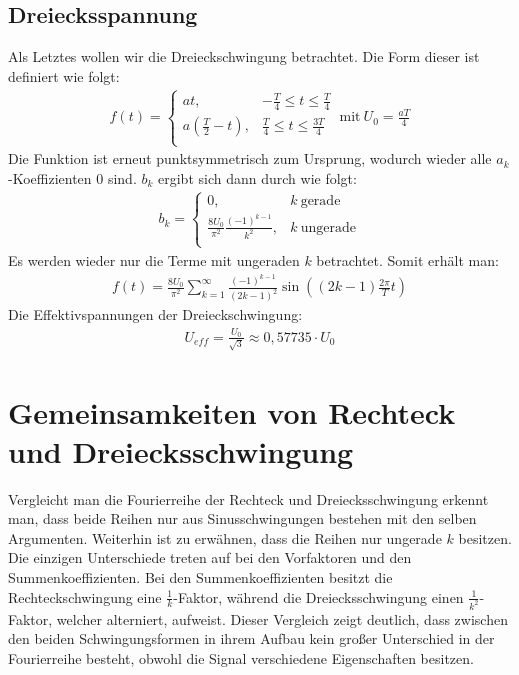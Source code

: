 \subsection*{Dreiecksspannung}
\label{sub:triangle}
Als Letztes wollen wir die Dreieckschwingung betrachtet. Die Form dieser ist definiert wie folgt:
\begin{gather}
    f(t) = 
    \begin{cases}
        at, & -\frac{T}{4} \leq t \leq \frac{T}{4} \\
        a\left(\frac{T}{2}-t\right), & \frac{T}{4} \leq t \leq \frac{3T}{4} \\
    \end{cases}
    ~\text{mit}~U_0 = \frac{aT}{4}
\end{gather} 
Die Funktion ist erneut punktsymmetrisch zum Ursprung, wodurch wieder alle $a_k$-Koeffizienten 0 sind. $b_k$ ergibt sich dann durch wie folgt:
\begin{gather}
    b_k =
    \begin{cases}
        0, & k~\text{gerade}\\
        \frac{8U_0}{\pi^2}\frac{(-1)^{k-1}}{k^2}, & k~\text{ungerade}\\
    \end{cases}
\end{gather}
Es werden wieder nur die Terme mit ungeraden $k$ betrachtet. Somit erhält man:
\begin{gather}
    \boxed{f(t) = \frac{8U_0}{\pi^2} \sum^{\infty}_{k=1} \frac{(-1)^{k-1}}{(2k-1)^2} \sin((2k-1)\frac{2\pi}{T}t)}
\end{gather} 
Die Effektivspannungen der Dreieckschwingung:
\begin{gather}
     \boxed{U_{eff} = \frac{U_0}{\sqrt{3}}\approx 0,57735 \cdot U_0}
\end{gather}
\section*{Gemeinsamkeiten von Rechteck und Dreiecksschwingung}
Vergleicht man die Fourierreihe der Rechteck und Dreiecksschwingung erkennt man, dass beide Reihen nur aus Sinusschwingungen bestehen mit den selben Argumenten. Weiterhin ist zu erwähnen, dass die Reihen nur ungerade $k$ besitzen. Die einzigen Unterschiede treten auf bei den Vorfaktoren und den Summenkoeffizienten. Bei den Summenkoeffizienten besitzt die Rechteckschwingung eine $\frac{1}{k}$-Faktor, während die Dreiecksschwingung einen $\frac{1}{k^2}$-Faktor, welcher alterniert, aufweist. Dieser Vergleich zeigt deutlich, dass zwischen den beiden Schwingungsformen in ihrem Aufbau kein großer Unterschied in der Fourierreihe besteht, obwohl die Signal verschiedene Eigenschaften besitzen.